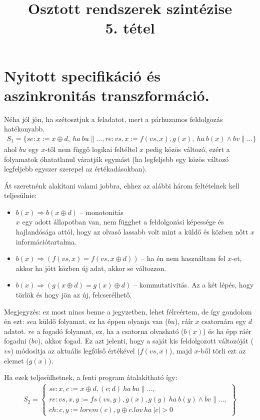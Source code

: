 \documentclass{article}
\title{Osztott rendszerek szintézise\\5. tétel}
\begin{document}

\section*{Nyitott specifikáció és aszinkronitás transzformáció.}
Néha jól jön, ha szétosztjuk a feladatot, mert a párhuzamos feldolgozás hatékonyabb.
\begin{align*}
S_1 = \lbrace se:x:=x\oplus d,\ ha\ bu\parallel ..., re: vs,x:=f(vs,x),g(x),\ ha\ b(x) \land bv \parallel ... \rbrace
\end{align*}
ahol $bu$ egy $x$-től nem függő logikai feltéltel $x$ pedig közös változó, ezért a folyamatok óhatatlanul váratják egymást (ha legfeljebb egy közös változó legfeljebb egyszer szerepel az értékadásokban).

Át szeretnénk alakítani valami jobbra, ehhez az alábbi három feltételnek kell teljesülnie:
\begin{itemize}
\item $b(x) \Rightarrow b(x\oplus d)$ -- monotonitás\\
$x$ egy adott állapotban van, nem függhet a feldolgozási képessége és hajlandósága attól, hogy az olvasó lassabb volt mint a küldő és közben nőtt $x$ információtartalma.
\item $b(x) \Rightarrow (f(vs,x) = f(vs,x\oplus d))$ -- ha én nem használtam fel $x$-et, akkor ha jött közben új adat, akkor se változzon.
\item $b(x) \Rightarrow (g(x\oplus d) = g(x) \oplus d)$ -- kommutativitás. Az a két lépés, hogy törlök és hogy jön az új, felcserélhető.
\end{itemize}
Megjegyzés: ez most nincs benne a jegyzetben, lehet félreértem, de így gondolom én ezt:
$se $a küldő folyamat, ez ha éppen olyanja van ($bu$), ráír $x$ csatornára egy $d$ adatot. $re$ a fogadó folyamat, ez, ha a csatorna olvasható ($b(x)$) és ha épp ráér fogadni ($bv$), akkor fogad. Ez azt jelenti, hogy a saját kis feldolgozott változóját ($vs$) módosítja az aktuális legfölső értékével ($f(vs,x)$), majd $x$-ből törli ezt az elemet ($g(x)$).

Ha ezek teljesülhetnek, a fenti program átalakítható így:
\begin{align*}
    S_2 = \left\{ \begin{array}{l}
        se:x,c := x \oplus d,(c;d)\ ha\ bu \parallel \dots, \\
        re:vs,x,y := fs(vs,y),g(x),g(y)\ ha\ b(y) \land bv \parallel \dots,\\
        ch:c,y:=lorem(c),y\oplus c.lov\ ha\ |c| > 0
    \end{array}\right\}
\end{align*}
\end{document}
